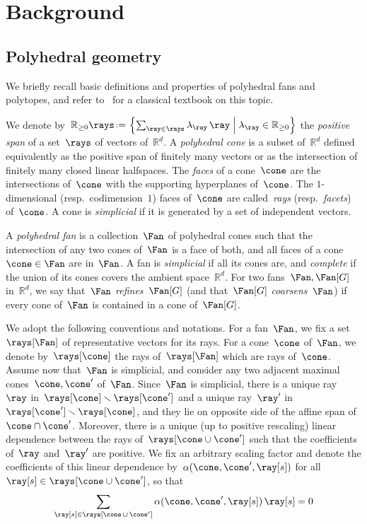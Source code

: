 \documentclass{amsart}
\theoremstyle{definition}
\newcommand{\R}{\mathbb{R}} %
\newcommand{\set}[2]{\left\{ #1 \;\middle|\; #2 \right\}} %
\newcommand{\ssm}{\smallsetminus} %
\newcommand{\eqdef}{\mbox{\,\raisebox{0.2ex}{\scriptsize\ensuremath{\mathrm:}}\ensuremath{=}\,}} %
\newcommand{\darkblue}{\color{darkblue}} %
\newcommand{\defn}[1]{\textsl{\darkblue #1}} %
\newcommand{\coefficient}{\alpha} %
\begin{document}
\section{Background}

\subsection{Polyhedral geometry}

We briefly recall basic definitions and properties of polyhedral fans and polytopes, and refer to~\cite{Ziegler-polytopes} for a classical textbook on this topic.

We denote by~$\R_{\ge0}\rays \eqdef \set{\sum_{\ray \in \rays} \lambda_{\ray} \, \ray}{\lambda_{\ray} \in \R_{\ge0}}$ the \defn{positive span} of a set~$\rays$ of vectors of~$\R^d$.
A \defn{polyhedral cone} is a subset of~$\R^d$ defined equivalently as the positive span of finitely many vectors or as the intersection of finitely many closed linear halfspaces.
The \defn{faces} of a cone~$\cone$ are the intersections of~$\cone$ with the supporting hyperplanes of~$\cone$.
The $1$-dimensional (resp.~codimension~$1$) faces of~$\cone$ are called~\defn{rays} (resp.~\defn{facets}) of~$\cone$.
A cone is \defn{simplicial} if it is generated by a set of independent vectors.

A \defn{polyhedral fan} is a collection~$\Fan$ of polyhedral cones such that the intersection of any two cones of~$\Fan$ is a face of both, and all faces of a cone~$\cone \in \Fan$ are in~$\Fan$.
A fan is \defn{simplicial} if all its cones are, and \defn{complete} if the union of its cones covers the ambient space~$\R^d$.
For two fans~$\Fan, \Fan[G]$ in~$\R^d$, we say that~$\Fan$ \defn{refines}~$\Fan[G]$ (and that~$\Fan[G]$ \defn{coarsens}~$\Fan$) if every cone of~$\Fan$ is contained in a cone of~$\Fan[G]$.

We adopt the following conventions and notations.
For a fan~$\Fan$, we fix a set~$\rays[\Fan]$ of representative vectors for its rays.
For a cone~$\cone$ of~$\Fan$, we denote by~$\rays[\cone]$ the rays of~$\rays[\Fan]$ which are rays of~$\cone$.
Assume now that~$\Fan$ is simplicial, and consider any two adjacent maximal cones~$\cone, \cone'$ of~$\Fan$.
Since~$\Fan$ is simplicial, there is a unique ray~$\ray$ in~$\rays[\cone] \ssm \rays[\cone']$ and a unique ray~$\ray'$ in~$\rays[\cone'] \ssm \rays[\cone]$, and they lie on opposite side of the affine span of~$\cone \cap \cone'$.
Moreover, there is a unique (up to positive rescaling) linear dependence between the rays of~$\rays[\cone \cup \cone']$ such that the coefficients of~$\ray$ and~$\ray'$ are positive.
We fix an arbitrary scaling factor and denote the coefficients of this linear dependence by~$\coefficient(\cone, \cone', \ray[s])$ for all~$\ray[s] \in \rays[\cone \cup \cone']$, so that
\[
\sum_{\ray[s] \in \rays[\cone \,\cup\, \cone']} \coefficient(\cone, \cone', \ray[s]) \, \ray[s] = 0
\]
\end{document}
